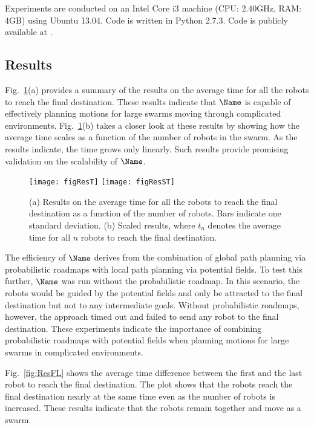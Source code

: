 
Experiments are conducted on an Intel Core i3 machine (CPU: 2.40GHz,
RAM: 4GB) using Ubuntu 13.04. Code is written in Python 2.7.3. Code is
publicly available at \cite{CodeBoids}.

\subsection{Results}
\label{sec:Results}

Fig.~\ref{fig:ResT}(a) provides a summary of the results on the
average time for all the robots to reach the final
destination. These results indicate that $\Name$ is capable of
effectively planning motions for large swarms moving through
complicated environments. Fig.~\ref{fig:ResT}(b) takes a closer
look at these results by showing how
the average time scales as a function of the number of robots in the
swarm. As the results indicate, the time grows only linearly. Such
results provide promising validation on the scalability of $\Name$. 

\begin{figure}
\centering
\texttt{[image: figResT]}
\texttt{[image: figResST]}
\caption{(a) Results on the average time for all the robots to reach the
  final destination as a function of the number of robots. Bars
  indicate one standard deviation. (b) Scaled results, where $t_n$
  denotes the average time for all $n$ robots to reach the final destination.}
\label{fig:ResT}
\end{figure}

\noindent
The efficiency of $\Name$ derives from the combination of global path
planning via probabilistic roadmaps with local path planning via
potential fields.  To test this further, $\Name$ was run without the
probabilistic roadmap. In this scenario, the robots would be guided by
the potential fields and only be attracted to the final destination
but not to any intermediate goals. Without probabilistic roadmaps,
however, the approach timed out and failed to send any robot to the
final destination. These experiments indicate the importance of
combining probabilistic roadmaps with potential fields when planning
motions for large swarms in complicated environments.


Fig.~\ref{fig:ResFL} shows the average time difference between the
first and the last robot to reach the final destination. The plot
shows that the robots reach the final destination nearly at the same
time even as the number of robots is increased. These results indicate
that the robots remain together and move as a swarm.  



